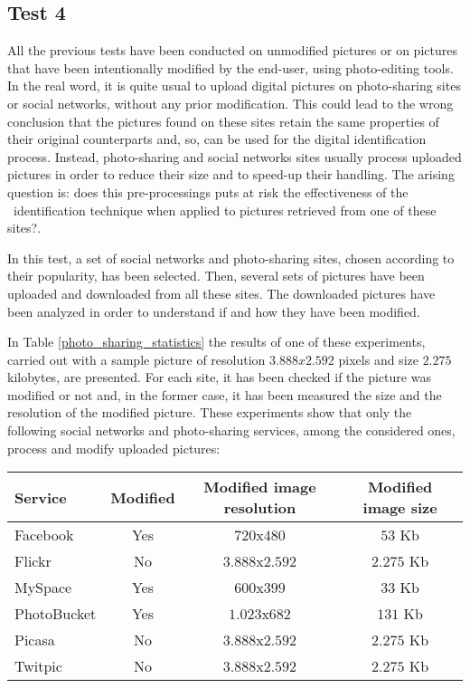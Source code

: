 \subsection{Test 4}\label{exp4}
All the previous tests have been conducted on unmodified pictures or on pictures that have been intentionally modified by the end-user, using  photo-editing tools. In the real word, it is quite usual to upload digital pictures on photo-sharing sites or social networks, without any prior modification. This could lead to the wrong conclusion that the pictures found on these sites retain the same properties of their original counterparts and, so, can be used for the digital identification process.  Instead, photo-sharing and social networks sites usually process uploaded pictures in order to reduce their size and to speed-up their handling. The arising question is: does this pre-processings puts at risk the effectiveness of  the \Lukas\ identification technique when applied to pictures retrieved from one of these sites?.

In this test, a set of social networks and photo-sharing sites, chosen according to their popularity, has been selected. Then, several sets of pictures have been uploaded and downloaded  from all these sites. The downloaded pictures have been analyzed in order to understand if and how they have been modified.

In Table \ref{photo_sharing_statistics} the results of one of these experiments, carried out with a sample picture of resolution $3.888x2.592$ pixels and size $2.275$ kilobytes, are presented. For each site, it has been checked if the picture was modified or not and, in the former case, it has been measured the size and the resolution of the modified picture. These experiments show that only the following social networks and photo-sharing services, among the considered ones, process and modify uploaded pictures:

\begin{table*}[htb]
\centering

\caption{Modifications performed by several photo-sharing and social network sites on a target image of resolution  $3.888x2.592$ pixels and size $2.275$ kilobytes .}

\begin{tabular}{  |l | c | c  |  c |} 
\hline

Service & Modified & Modified image resolution & Modified image size \\ \hline


Facebook & Yes & $720$x$480$ & $53$ Kb  \\
Flickr & No & $3.888$x$2.592$ & $2.275$ Kb \\
MySpace & Yes  & $600$x$399$ & $33$ Kb\\
PhotoBucket & Yes  & $1.023$x$682$ & $131$ Kb \\
Picasa & No & $3.888$x$2.592$ & $2.275$ Kb\\
Twitpic & No & $3.888$x$2.592$ & $2.275$ Kb  \\

\hline
\end{tabular}
\label{photo_sharing_statistics}
\end{table*}


